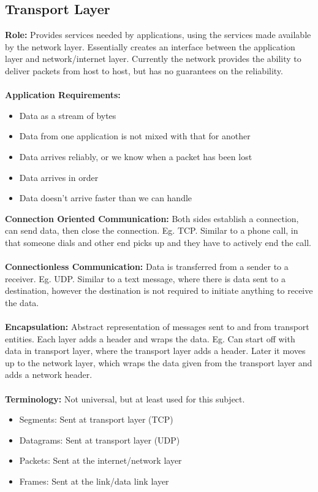 \documentclass[a4paper,10pt]{article}
\begin{document}
\subsection{Transport Layer}
\textcolor{PineGreen}{\textbf{Role:}} Provides services needed by applications, using the services made available by the network layer. Essentially creates an interface between the application layer and network/internet layer. Currently the network provides the ability to deliver packets from host to host, but has no guarantees on the reliability. \\\\
\textcolor{PineGreen}{\textbf{Application Requirements:}} 
\begin{itemize}
	\item Data as a stream of bytes 
	\item Data from one application is not mixed with that for another 
	\item Data arrives reliably, or we know when a packet has been lost
	\item Data arrives in order 
	\item Data doesn't arrive faster than we can handle  
\end{itemize}
\textcolor{PineGreen}{\textbf{Connection Oriented Communication:}} Both sides establish a connection, can send data, then close the connection. Eg. TCP. Similar to a phone call, in that someone dials and other end picks up and they have to actively end the call. \\\\
\textcolor{PineGreen}{\textbf{Connectionless Communication:}} Data is transferred from a sender to a receiver. Eg. UDP. Similar to a text message, where there is data sent to a destination, however the destination is not required to initiate anything to receive the data. \\\\
\textcolor{PineGreen}{\textbf{Encapsulation:}} Abstract representation of messages sent to and from transport entities. Each layer adds a header and wraps the data. Eg. Can start off with data in transport layer, where the transport layer adds a header. Later it moves up to the network layer, which wraps the data given from the transport layer and adds a network header. \\\\
\textcolor{PineGreen}{\textbf{Terminology:}} Not universal, but at least used for this subject. 
\begin{itemize}
	\item Segments: Sent at transport layer (TCP)
	\item Datagrams: Sent at transport layer (UDP)
	\item Packets: Sent at the internet/network layer
	\item Frames: Sent at the link/data link layer 
\end{itemize}
\end{document}
